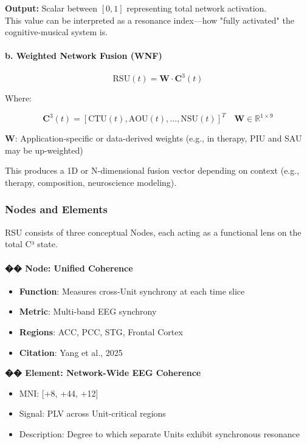 \documentclass[10pt]{article}
\begin{document}
\textbf{Output:} Scalar between $[0,1]$ representing total network activation.\\
This value can be interpreted as a resonance index—how "fully activated" the cognitive-musical system is.

\paragraph{b. Weighted Network Fusion (WNF)}

\[
\text{RSU}(t) = \mathbf{W} \cdot \mathbf{C}^3(t)
\]

Where:

\[
\mathbf{C}^3(t) = [\text{CTU}(t), \text{AOU}(t), \ldots, \text{NSU}(t)]^T \quad \mathbf{W} \in \mathbb{R}^{1 \times 9}
\]

$\mathbf{W}$: Application-specific or data-derived weights (e.g., in therapy, PIU and SAU may be up-weighted)

This produces a 1D or N-dimensional fusion vector depending on context (e.g., therapy, composition, neuroscience modeling).

\subsubsection*{Nodes and Elements}

RSU consists of three conceptual Nodes, each acting as a functional lens on the total C³ state.

\paragraph{�� Node: Unified Coherence}

\begin{itemize}
    \item \textbf{Function}: Measures cross-Unit synchrony at each time slice
    \item \textbf{Metric}: Multi-band EEG synchrony
    \item \textbf{Regions}: ACC, PCC, STG, Frontal Cortex
    \item \textbf{Citation}: Yang et al., 2025
\end{itemize}

\textbf{�� Element: Network-Wide EEG Coherence}

\begin{itemize}
    \item MNI: [+8, +44, +12]
    \item Signal: PLV across Unit-critical regions
    \item Description: Degree to which separate Units exhibit synchronous resonance
\end{itemize}
\end{document}
